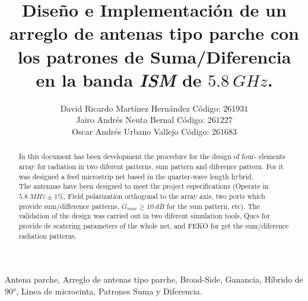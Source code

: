 \documentclass[twocolumn]{IEEEtran}
\begin{document}
\title{Diseño e Implementación de un arreglo de antenas tipo parche con los patrones de Suma/Diferencia en la banda \textit{ISM} de $5.8\ GHz$.}
\author{David Ricardo Martínez Hernández Código: $261931$\\
	Jairo Andrés Neuta Bernal Código: $261227$\\
	Oscar Andrés Urbano Vallejo Código: $261683$}
\maketitle
{}

\begin{abstract}
 In this document has been development the procedure for the design of four- elements array for radiation in two diferent patterns, sum pattern and diference pattern. For it was designed a feed microstrip net based in the quarter-wave length hybrid.\\
The antennas have been designed to meet the project especifications (Operate in $5.8\ MHz \pm 1\%$, Field polarization orthogonal to the array axis, two ports which provide sum/difference patterns, $G_{max} \geq 10\ dB$ for the sum pattern, etc). The validation of the design was carried out in two diferent simulation tools, Qucs for provide de scatering parameters of the whole net, and FEKO for get the sum/diference radiation patterns.
\end{abstract}

\begin{IEEEkeywords}
 Antena parche, Arreglo de antenas tipo parche, Broad-Side, Ganancia, Híbrido de $90°$, Linea de microcinta, Patrones Suma y Diferencia.
\end{IEEEkeywords}
\end{document}
